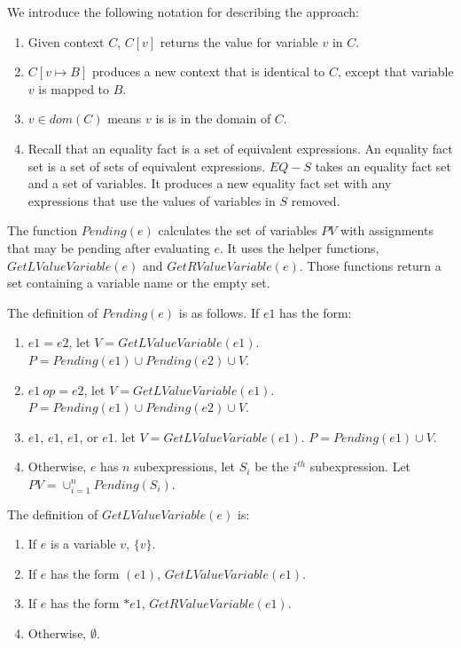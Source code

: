 We introduce the following notation for describing the approach:
\begin{enumerate}
\item Given context $C$, $C[v]$ returns the value for variable $v$ in $C$.
\item $C[v \mapsto B]$ produces a new context that is identical to $C$,
except that variable $v$ is mapped to $B$.
\item $v \in dom(C)$ means $v$ is is in the domain of $C$.
\item Recall that an equality fact is a set of equivalent expressions.  An 
equality fact set is a set of sets of equivalent expressions.  $EQ - S$ takes
an equality fact set and a set of variables.  It produces a new equality fact
set with any expressions that use the values of variables in $S$ removed.
\end{enumerate}

The function $Pending(e)$ calculates the set of variables $PV$
with assignments that may be pending after evaluating $e$.  It uses
the helper functions,
$GetLValueVariable(e)$ and $GetRValueVariable(e)$.  Those functions
return a set containing a variable name or the empty set.

The definition of $Pending(e)$ is as follows. If $e1$ has the form:
\begin{enumerate}
\item $e1 = e2$, let $V = GetLValueVariable(e1)$.
$P = Pending(e1) \cup Pending(e2) \cup V$.
\item$e1~op= e2$, let $V = GetLValueVariable(e1)$.
$P = Pending(e1) \cup Pending(e2) \cup V$.
\item \code{++}$e1$, \code{--}$e1$, $e1$\code{++}, or $e1$\code{--}.
let $V =  GetLValueVariable(e1)$.  $P = Pending(e1) \cup V$.
\item Otherwise, $e$ has $n$ subexpressions, let $S_i$ be
the $i^{th}$ subexpression.  Let $PV = \cup_{i=1}^{n} Pending(S_i)$.
\end{enumerate}

The definition of $GetLValueVariable(e)$ is:
\begin{enumerate}
\item If $e$ is a variable $v$, $\{ v \}$.
\item If $e$ has the form $(e1)$, $GetLValueVariable(e1)$.
\item If $e$ has the form $*e1$, $GetRValueVariable(e1)$.
\item Otherwise, $\emptyset$.
\end{enumerate}

